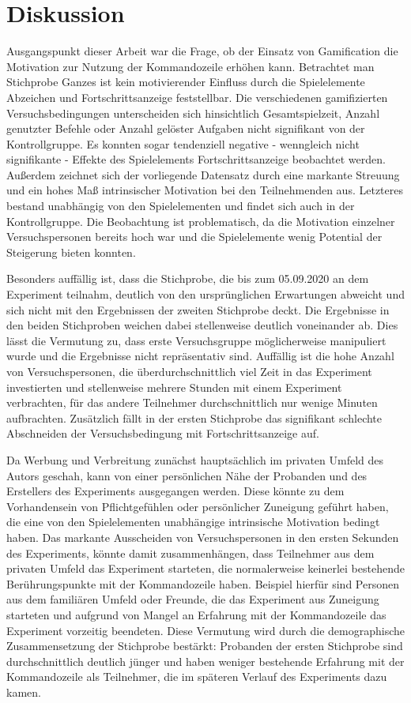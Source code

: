 \section{Diskussion}
Ausgangspunkt dieser Arbeit war die Frage, ob der Einsatz von Gamification die Motivation zur Nutzung der Kommandozeile erhöhen kann. Betrachtet man Stichprobe Ganzes ist kein motivierender Einfluss durch die Spielelemente Abzeichen und Fortschrittsanzeige feststellbar. Die verschiedenen gamifizierten Versuchsbedingungen unterscheiden sich hinsichtlich Gesamtspielzeit, Anzahl genutzter Befehle oder Anzahl gelöster Aufgaben nicht signifikant von der Kontrollgruppe. Es konnten sogar tendenziell negative - wenngleich nicht signifikante - Effekte des Spielelements Fortschrittsanzeige beobachtet werden. Außerdem zeichnet sich der vorliegende Datensatz durch eine markante Streuung und ein hohes Maß intrinsischer Motivation bei den Teilnehmenden aus. Letzteres bestand unabhängig von den Spielelementen und findet sich auch in der Kontrollgruppe. Die Beobachtung ist problematisch, da die Motivation einzelner Versuchspersonen bereits hoch war und die Spielelemente wenig Potential der Steigerung bieten konnten.

Besonders auffällig ist, dass die Stichprobe, die bis zum 05.09.2020 an dem Experiment teilnahm, deutlich von den ursprünglichen Erwartungen abweicht und sich nicht mit den Ergebnissen der zweiten Stichprobe deckt. Die Ergebnisse in den beiden Stichproben weichen dabei stellenweise deutlich voneinander ab. Dies lässt die Vermutung zu, dass erste Versuchsgruppe möglicherweise manipuliert wurde und die Ergebnisse nicht repräsentativ sind. Auffällig ist die hohe Anzahl von Versuchspersonen, die überdurchschnittlich viel Zeit in das Experiment investierten und stellenweise mehrere Stunden mit einem Experiment verbrachten, für das andere Teilnehmer durchschnittlich nur wenige Minuten aufbrachten. Zusätzlich fällt in der ersten Stichprobe das signifikant schlechte Abschneiden der Versuchsbedingung mit Fortschrittsanzeige auf.

Da Werbung und Verbreitung zunächst hauptsächlich im privaten Umfeld des Autors geschah, kann von einer persönlichen Nähe der Probanden und des Erstellers des Experiments ausgegangen werden. Diese könnte zu dem Vorhandensein von Pflichtgefühlen oder persönlicher Zuneigung geführt haben, die eine von den Spielelementen unabhängige intrinsische Motivation bedingt haben. Das markante Ausscheiden von Versuchspersonen in den ersten Sekunden des Experiments, könnte damit zusammenhängen, dass Teilnehmer aus dem privaten Umfeld das Experiment starteten, die normalerweise keinerlei bestehende Berührungspunkte mit der Kommandozeile haben. Beispiel hierfür sind Personen aus dem familiären Umfeld oder Freunde, die das Experiment aus Zuneigung starteten und aufgrund von Mangel an Erfahrung mit der Kommandozeile das Experiment vorzeitig beendeten. Diese Vermutung wird durch die demographische Zusammensetzung der Stichprobe bestärkt: Probanden der ersten Stichprobe sind durchschnittlich deutlich jünger und haben weniger bestehende Erfahrung mit der Kommandozeile als Teilnehmer, die im späteren Verlauf des Experiments dazu kamen.

